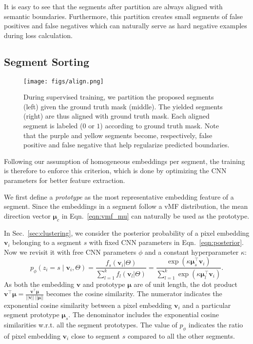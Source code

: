 \documentclass[10pt,twocolumn,letterpaper]{article}
\begin{document}
It is easy to see that the segments after partition are always aligned with semantic boundaries.
Furthermore, this partition creates small segments of false positives and false negatives which can naturally serve as hard negative examples during loss calculation.



\subsection{Segment Sorting}
\label{sec:training}

\begin{figure}[t]
    \centering
    \texttt{[image: figs/align.png]}
    \caption{During supervised training, we partition the proposed segments (left) given the ground truth mask (middle). The yielded segments (right) are thus aligned with ground truth mask. Each aligned segment is labeled ($0$ or $1$) according to ground truth mask. Note that the purple and yellow segments become, respectively, false positive and false negative that help regularize predicted boundaries.}
    \label{fig:align}
\end{figure}






Following our assumption of homogeneous embeddings per segment, the training is therefore to enforce this criterion, which is done by optimizing the CNN parameters for better feature extraction.


We first define a {\it prototype} as the most representative embedding feature of a segment. Since the embeddings in a segment follow a vMF distribution, the mean direction vector $\pmb{\mu}_c$ in Eqn.~\ref{eqn:vmf_mu} can naturally be used as the prototype.


In Sec.~\ref{sec:clustering}, we consider 
the posterior probability of a pixel embedding $\pmb{v}_i$ belonging to a segment $s$ with fixed CNN parameters in Eqn.~\ref{eqn:posterior}. Now we revisit it with free CNN parameters $\phi$ and a constant hyperparameter $\kappa$:
\begin{equation}
\label{eqn:posterior_cnn}
p_\phi(z_i=s \mid \pmb{v}_i, \Theta) =  \frac{f_s(\pmb{v}_i|\Theta)}{\sum_{l=1}^k f_l(\pmb{v}_l|\Theta)} = \frac{ \exp(\kappa \pmb{\mu}_s^\top \pmb{v}_i) }{ \sum_{l=1}^k \exp(\kappa \pmb{\mu}_l^\top \pmb{v}_i) }.
\end{equation}
As both the embedding $\pmb{v}$ and prototype $\pmb{\mu}$ are of unit length, the dot product $\pmb{v}^\top \pmb{\mu} = \frac{\pmb{v}^\top \pmb{\mu}}{||\pmb{v}||\ ||\pmb{\mu}||}$ becomes the cosine similarity.
The numerator indicates the exponential cosine similarity between a pixel embedding $\pmb{v}_i$ and a particular segment prototype $\pmb{\mu}_s$.
The denominator includes the exponential cosine similarities w.r.t. all the segment prototypes.
The value of $p_\phi$ indicates the ratio of pixel embedding $\pmb{v}_i$ close to segment $s$ compared to all the other segments.
\end{document}
